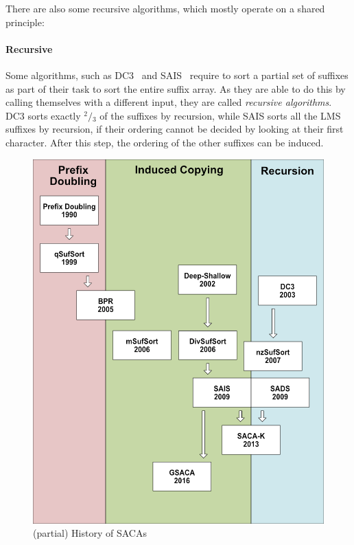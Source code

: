 \bigskip

There are also some recursive algorithms, which mostly operate on a shared principle:
%
\paragraph{Recursive} Some algorithms, such as DC3~\cite{saca:9} and SAIS~\cite{saca:6} require to sort a
partial set of suffixes as part of their task to sort the entire suffix array.
As they are able to do this by calling themselves with a different input, they are called \emph{recursive algorithms}.
DC3 sorts exactly $^2\!/\!_3$ of the suffixes by recursion, while SAIS sorts all the LMS suffixes by recursion,
if their ordering cannot be decided by looking at their first character.
After this step, the ordering of the other suffixes can be induced.

\begin{figure}[!t]
    \includegraphics[width=\textwidth]{kapitel/5_saca_uebersicht/history/history3_eng.png}
    \caption{(partial) History of SACAs}
    \label{ea:fig:history}
\end{figure}

